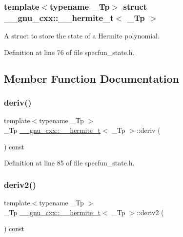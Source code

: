 \subsubsection*{template$<$typename \+\_\+\+Tp$>$\newline
struct \+\_\+\+\_\+gnu\+\_\+cxx\+::\+\_\+\+\_\+hermite\+\_\+t$<$ \+\_\+\+Tp $>$}

A struct to store the state of a Hermite polynomial. 

Definition at line 76 of file specfun\+\_\+state.\+h.



\subsection{Member Function Documentation}
\mbox{\label{struct____gnu__cxx_1_1____hermite__t_aa92fd4096ca98fedad08b95187bb7a34}} 
\subsubsection{\texorpdfstring{deriv()}{deriv()}}
{\footnotesize\ttfamily template$<$typename \+\_\+\+Tp $>$ \\
\+\_\+\+Tp \hyperlink{struct____gnu__cxx_1_1____hermite__t}{\+\_\+\+\_\+gnu\+\_\+cxx\+::\+\_\+\+\_\+hermite\+\_\+t}$<$ \+\_\+\+Tp $>$\+::deriv (\begin{DoxyParamCaption}{ }\end{DoxyParamCaption}) const\hspace{0.3cm}{\ttfamily [inline]}}



Definition at line 85 of file specfun\+\_\+state.\+h.

\mbox{\label{struct____gnu__cxx_1_1____hermite__t_a2deb14d149cf302151ae1d318adec995}} 
\subsubsection{\texorpdfstring{deriv2()}{deriv2()}}
{\footnotesize\ttfamily template$<$typename \+\_\+\+Tp $>$ \\
\+\_\+\+Tp \hyperlink{struct____gnu__cxx_1_1____hermite__t}{\+\_\+\+\_\+gnu\+\_\+cxx\+::\+\_\+\+\_\+hermite\+\_\+t}$<$ \+\_\+\+Tp $>$\+::deriv2 (\begin{DoxyParamCaption}{ }\end{DoxyParamCaption}) const\hspace{0.3cm}{\ttfamily [inline]}}



